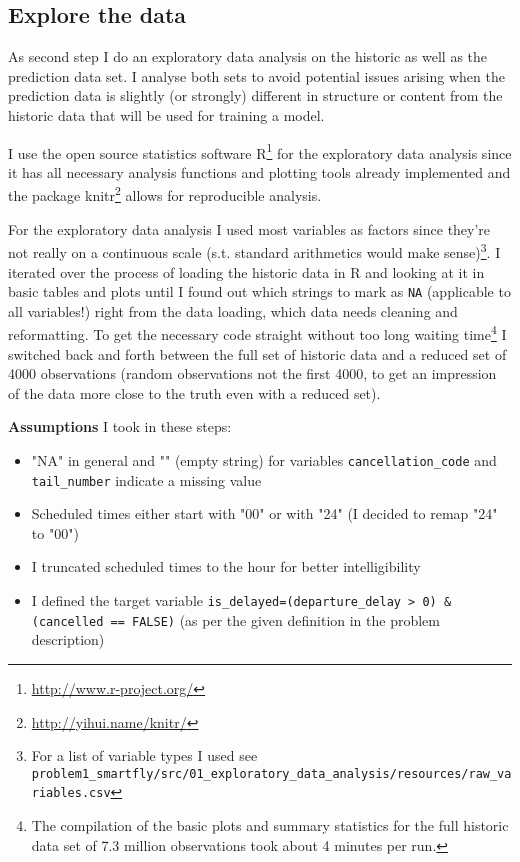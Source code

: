 \documentclass{article}\usepackage[]{graphicx}\usepackage[]{color}
\begin{document}



\subsection{Explore the data} %
\label{sub:explore_data}

As second step I do an exploratory data analysis on the historic as well as the prediction data set. I analyse both sets to avoid potential issues arising when the prediction data is slightly (or strongly) different in structure or content from the historic data that will be used for training a model. 

I use the open source statistics software R\footnote{\url{http://www.r-project.org/}} for the exploratory data analysis since it has all necessary analysis functions and plotting tools already implemented and the package knitr\footnote{\url{http://yihui.name/knitr/}} allows for reproducible analysis.

For the exploratory data analysis I used most variables as factors since they're not really on a continuous scale (s.t. standard arithmetics would make sense)\footnote{For a list of variable types I used see \verb+problem1_smartfly/src/01_exploratory_data_analysis/resources/raw_variables.csv+}.
I iterated over the process of loading the historic data in R and looking at it in basic tables and plots until I found out which strings to mark as \verb+NA+ (applicable to all variables!) right from the data loading, which data needs cleaning and reformatting. To get the necessary code straight without too long waiting time\footnote{The compilation of the basic plots and summary statistics for the full historic data set of 7.3 million observations took about 4 minutes per run.} I switched back and forth between the full set of historic data and a reduced set of 4000 observations (random observations not the first 4000, to get an impression of the data more close to the truth even with a reduced set).

\textbf{Assumptions} I took in these steps: 
\begin{itemize}
	\item "NA" in general and "" (empty string) for variables \verb+cancellation_code+ and \verb+tail_number+ indicate a missing value
	\item Scheduled times either start with "00" or with "24" (I decided to remap "24" to "00")
	\item I truncated scheduled times to the hour for better intelligibility
	\item I defined the target variable \verb+is_delayed=(departure_delay > 0) & (cancelled == FALSE)+ (as per the given definition in the problem description)
\end{itemize}
\end{document}

